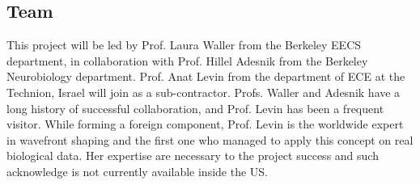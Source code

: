 \subsection{Team}
This project will be led by Prof. Laura Waller from the Berkeley EECS department, in collaboration with Prof. Hillel Adesnik from the Berkeley Neurobiology department. Prof. Anat Levin from the department of ECE at the Technion, Israel will join as a sub-contractor. Profs. Waller and Adesnik have a long history of successful collaboration, and Prof. Levin has been a frequent visitor.
While forming a foreign component, Prof. Levin is the worldwide expert in wavefront shaping and the first one who managed to apply this concept on real biological data. Her expertise are necessary to the project success and such acknowledge is not currently available inside the US.    